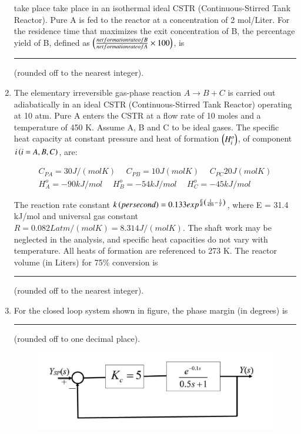 \documentclass[journal,12pt,onecolumn]{IEEEtran}
\theoremstyle{remark}
\begin{document}
\begin{enumerate}
    take place take place in an isothermal ideal CSTR (Continuous-Stirred Tank Reactor). Pure A is fed to the reactor at a concentration of 2 mol/Liter. For the residence time that maximizes the exit concentration of B, the percentage yield of B, defined as $\left(\frac{net formation rate of B}{net formation rate of A} \times 100\right)$, is \rule{1.5cm}{0.1mm}(rounded off to the nearest integer).
\newpage
    \item The elementary irreversible gas-phase reaction $A \to B + C$ is carried out adiabatically in an ideal CSTR (Continuous-Stirred Tank Reactor) operating at 10 atm. Pure A enters the CSTR at a flow rate of 10 moles and a temperature of 450 K. Assume A, B and C to be ideal gases. The specific heat capacity at constant pressure   and heat of formation $\left(H^{o}_{i}\right)$, of component $i \left(i = A, B, C\right)$, are: 

    \begin{align*}
        C_{PA} = 30J/(mol K) \hspace{15pt} C_{PB} = 10J(mol K) \hspace{15pt} C_{PC} 20J(mol K) \\ 
        H^{o}_{A} = -90 kJ/mol \hspace{15pt} H^{o}_{B} = -54 kJ/mol \hspace{15pt} H^{o}_{C} = -45 kJ/mol 
    \end{align*}

    The reaction rate constant $k \left(per second\right) = 0.133 exp^{\frac{E}{R}\left(\frac{1}{450} - \frac{1}{T}\right)}$, where E = 31.4 kJ/mol and universal gas constant $R = 0.082 L atm/(mol K) = 8.314 J/(mol K)$. The shaft work may be neglected in the analysis, and specific heat capacities do not vary with temperature. All heats of formation are referenced to 273 K. The reactor volume (in Liters) for 75\% conversion is \rule{1.5cm}{0.1mm}(rounded off to the nearest integer). 

    \item For the closed loop system shown in figure, the phase margin (in degrees) is \rule{2cm}{0.1mm}(rounded off to one decimal place). 

    \begin{figure}[H]
        \centering
        \includegraphics[width=0.5\columnwidth]{Fig/49.png}
        \caption*{}
        \label{fig: 49}
     

\end{figure}
\end{enumerate}
\end{document}
